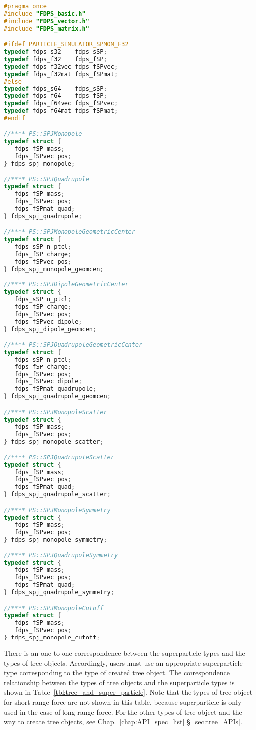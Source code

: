 \begin{lstlisting}[language=C,caption=Superparticle types (C),label=listing:superparticle_types_in_C]
#pragma once
#include "FDPS_basic.h"
#include "FDPS_vector.h"
#include "FDPS_matrix.h"

#ifdef PARTICLE_SIMULATOR_SPMOM_F32
typedef fdps_s32    fdps_sSP;
typedef fdps_f32    fdps_fSP;
typedef fdps_f32vec fdps_fSPvec;
typedef fdps_f32mat fdps_fSPmat;
#else
typedef fdps_s64    fdps_sSP;
typedef fdps_f64    fdps_fSP;
typedef fdps_f64vec fdps_fSPvec;
typedef fdps_f64mat fdps_fSPmat;
#endif

//**** PS::SPJMonopole
typedef struct {
   fdps_fSP mass;
   fdps_fSPvec pos;
} fdps_spj_monopole;

//**** PS::SPJQuadrupole
typedef struct {
   fdps_fSP mass;
   fdps_fSPvec pos;
   fdps_fSPmat quad;
} fdps_spj_quadrupole;

//**** PS::SPJMonopoleGeometricCenter
typedef struct {
   fdps_sSP n_ptcl;
   fdps_fSP charge;
   fdps_fSPvec pos;
} fdps_spj_monopole_geomcen;

//**** PS::SPJDipoleGeometricCenter
typedef struct {
   fdps_sSP n_ptcl;
   fdps_fSP charge;
   fdps_fSPvec pos;
   fdps_fSPvec dipole;
} fdps_spj_dipole_geomcen;

//**** PS::SPJQuadrupoleGeometricCenter
typedef struct {
   fdps_sSP n_ptcl;
   fdps_fSP charge;
   fdps_fSPvec pos;
   fdps_fSPvec dipole;
   fdps_fSPmat quadrupole;
} fdps_spj_quadrupole_geomcen;

//**** PS::SPJMonopoleScatter
typedef struct {
   fdps_fSP mass;
   fdps_fSPvec pos;
} fdps_spj_monopole_scatter;

//**** PS::SPJQuadrupoleScatter
typedef struct {
   fdps_fSP mass;
   fdps_fSPvec pos;
   fdps_fSPmat quad;
} fdps_spj_quadrupole_scatter;

//**** PS::SPJMonopoleSymmetry
typedef struct {
   fdps_fSP mass;
   fdps_fSPvec pos;
} fdps_spj_monopole_symmetry;

//**** PS::SPJQuadrupoleSymmetry
typedef struct {
   fdps_fSP mass;
   fdps_fSPvec pos;
   fdps_fSPmat quad;
} fdps_spj_quadrupole_symmetry;

//**** PS::SPJMonopoleCutoff
typedef struct {
   fdps_fSP mass;
   fdps_fSPvec pos;
} fdps_spj_monopole_cutoff;
\end{lstlisting}

There is an one-to-one correspondence between the superparticle types and the types of tree objects. Accordingly, users must use an appropriate superparticle type corresponding to the type of created tree object. The correspondence relationship between the types of tree objects and the superparticle types is shown in Table~\ref{tbl:tree_and_super_particle}. Note that the types of tree object for short-range force are not shown in this table, because superparticle is only used in the case of long-range force. For the other types of tree object and the way to create tree objects, see Chap.~\ref{chap:API_spec_list} \S~\ref{sec:tree_APIs}.

